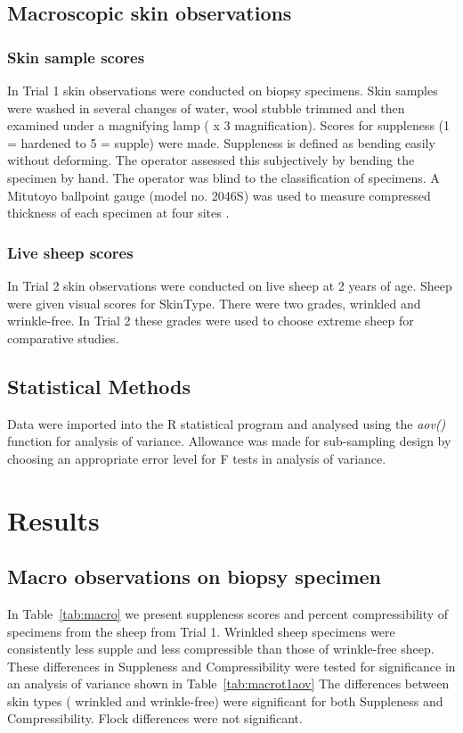 \documentclass{article}
\begin{document}
\subsection{Macroscopic skin observations}
\subsubsection{Skin sample scores}
In Trial 1 skin observations were conducted on biopsy specimens.
Skin samples were washed in several changes of water, wool stubble trimmed and then examined under a magnifying lamp ( x 3 magnification).  Scores for  suppleness (1 = hardened to 5 = supple) were made. Suppleness is defined as bending easily without deforming. The operator assessed this subjectively by bending the specimen by hand. The operator was blind to the classification of specimens.  A Mitutoyo ballpoint gauge (model no. 2046S) was used to measure compressed thickness of each specimen at four sites .  

\subsubsection{Live sheep scores}
In Trial 2 skin observations were conducted on live sheep at 2 years of age.
Sheep were given visual scores for SkinType. There were two grades, wrinkled and wrinkle-free. In Trial 2 these grades were used to choose extreme sheep for comparative studies. 

\subsection{Statistical Methods}

Data were imported into the R statistical program \cite{rcoreteam-2017} and analysed using the {\em aov()} function for analysis of variance.
Allowance was made for sub-sampling design by choosing  an appropriate error level for F tests in analysis of variance. 

\section{Results}

\subsection{Macro observations on biopsy specimen}
In Table~\ref{tab:macro} we present suppleness scores and percent compressibility of specimens from the sheep from Trial 1.
%
Wrinkled sheep specimens were consistently less supple and less compressible than those of wrinkle-free sheep.
These differences in Suppleness and Compressibility were tested for significance in an analysis of variance shown in Table~\ref{tab:macrot1aov}
%
The differences between skin types ( wrinkled and wrinkle-free) were significant for both Suppleness and Compressibility. Flock differences were not significant.
\end{document}
